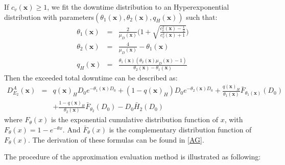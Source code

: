 \documentclass[preprint,12pt]{elsarticle}
\begin{document}
If $c_{v}(\boldsymbol{x}) \geq 1$, we fit the downtime distribution to an Hyperexponential distribution with parameters$(\theta_{1}(\boldsymbol{x}),\theta_{2}(\boldsymbol{x}), q_{H}(\boldsymbol{x}))$ such that:
\begin{eqnarray}
     \theta_{1}(\boldsymbol{x}) &=& \frac{2}{\mu_{D}(\boldsymbol{x})}\bigg(1+\sqrt{\frac{c^{2}_{v}(\boldsymbol{x})-\frac{1}{2}}{c^{2}_{v}(\boldsymbol{x})+1}} \bigg) \label{theta11}\\
     \theta_{2}(\boldsymbol{x}) &=& \frac{4}{\mu_{D}(\boldsymbol{x})} - \theta_{1}(\boldsymbol{x}) \label{theta12}\\
     q_{H}(\boldsymbol{x}) &=& \frac{\theta_1(\boldsymbol{x})(\theta_2(\boldsymbol{x})\mu_{D}(\boldsymbol{x})-1)}{\theta_2(\boldsymbol{x}) -\theta_1(\boldsymbol{x})} \label{q2}
\end{eqnarray}
Then the exceeded total downtime can be described as:
\begin{eqnarray}
D_{E_{2}}^{A}(\boldsymbol{x}) &=& q(\boldsymbol{x})_{H}D_{0}e^{-\theta_1(\boldsymbol{x}) D_{0}} + (1-q(\boldsymbol{x})_{H})D_{0}e^{-\theta_{2}(\boldsymbol{x})D_{0}}+\frac{q(\boldsymbol{x})_{H}}{\theta_{1}(\boldsymbol{x})}\bar{F}_{\theta_{1}(\boldsymbol{x})}(D_{0})\nonumber\\
&& + \frac{1-q(\boldsymbol{x})_{H}}{\theta_{2}(\boldsymbol{x})}\bar{F}_{\theta_{2}}(D_{0})-D_{0}\bar{H}_{2}(D_{0}) \label{EXD2}
\end{eqnarray}
where $F_{\theta}(x)$ is the exponential cumulative distribution function of $x$, with $F_{\theta}(x)= 1-e^{-\theta x}$. And $\bar{F}_{\theta}(x)$ is the complementary distribution function of $F_{\theta}(x)$.
The derivation of these formulas can be found in \ref{AG}.


The procedure of the approximation evaluation method is illustrated as following:
\end{document}
